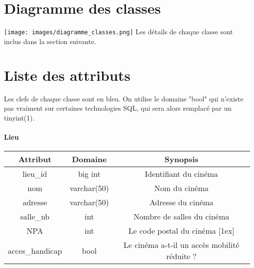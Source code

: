 \documentclass[12pt]{article}
\begin{document}
\section{Diagramme des classes}
    \texttt{[image: images/diagramme\_classes.png]}
Les détails de chaque classe sont inclus dans la section suivante.

\section{Liste des attributs}
Les clefs de chaque classe sont en {\color{blue} bleu}. On utilise le domaine "bool" qui n'existe pas vraiment
sur certaines technologies SQL, qui sera alors remplacé par un tinyint(1).
\label{sec:4}
\paragraph*{Lieu}
\begin{center}
    \begin{tabular}{||c c c||} 
     \hline
     Attribut & Domaine & Synopsis\\ [0.5ex] 
     \hline\hline
     {\color{blue} lieu{\_}id} & big int & Identifiant du cinéma \\ 
     \hline
     nom & varchar(50) & Nom du cinéma \\
    \hline
     adresse & varchar(50) & Adresse du cinéma \\
     \hline
     salle{\_}nb & int & Nombre de salles du cinéma\\
     \hline
     NPA & int & Le code postal du cinéma [1ex] \\
     \hline
     acces{\_}handicap & bool & Le cinéma a-t-il un accès mobilité réduite ? \\
     \hline
    \end{tabular}
\end{center}
\end{document}

